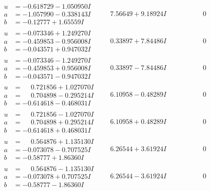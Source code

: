 \documentclass[1p]{elsarticle_modified}
\theoremstyle{definition}
\begin{document}
$$\begin{array}{c|c|c}
\begin{aligned}
u &= -0.618729 - 1.050950 I \\
a &= -1.057990 - 0.338143 I \\
b &= -0.12777 + 1.65559 I\end{aligned}
 & \phantom{-}7.56649 + 9.18924 I & \phantom{-0.000000 } 0 \\ \hline\begin{aligned}
u &= -0.073346 + 1.249270 I \\
a &= -0.459853 - 0.956008 I \\
b &= -0.043571 + 0.947032 I\end{aligned}
 & \phantom{-}0.33897 + 7.84486 I & \phantom{-0.000000 } 0 \\ \hline\begin{aligned}
u &= -0.073346 - 1.249270 I \\
a &= -0.459853 + 0.956008 I \\
b &= -0.043571 - 0.947032 I\end{aligned}
 & \phantom{-}0.33897 - 7.84486 I & \phantom{-0.000000 } 0 \\ \hline\begin{aligned}
u &= \phantom{-}0.721856 + 1.027070 I \\
a &= \phantom{-}0.704898 - 0.295214 I \\
b &= -0.614618 - 0.468031 I\end{aligned}
 & \phantom{-}6.10958 - 0.48289 I & \phantom{-0.000000 } 0 \\ \hline\begin{aligned}
u &= \phantom{-}0.721856 - 1.027070 I \\
a &= \phantom{-}0.704898 + 0.295214 I \\
b &= -0.614618 + 0.468031 I\end{aligned}
 & \phantom{-}6.10958 + 0.48289 I & \phantom{-0.000000 } 0 \\ \hline\begin{aligned}
u &= \phantom{-}0.564876 + 1.135130 I \\
a &= -0.073078 - 0.707525 I \\
b &= -0.58777 + 1.86360 I\end{aligned}
 & \phantom{-}6.26544 + 3.61924 I & \phantom{-0.000000 } 0 \\ \hline\begin{aligned}
u &= \phantom{-}0.564876 - 1.135130 I \\
a &= -0.073078 + 0.707525 I \\
b &= -0.58777 - 1.86360 I\end{aligned}
 & \phantom{-}6.26544 - 3.61924 I & \phantom{-0.000000 } 0\\

\end{array}$$
\end{document}
